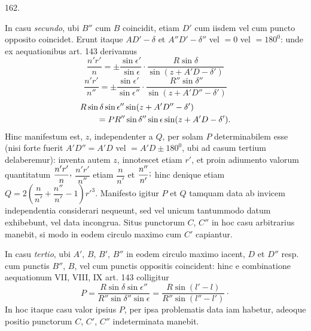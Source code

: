 \par{}\medskip
\begin{center}\hypertarget{native-225-article162}{}162.\end{center}
In casu \emph{secundo}, ubi $B''$ cum $B$ coincidit, etiam $D'$ cum iisdem vel
cum puncto opposito coincidet. Erunt itaque $AD'-\delta$ et $A''D'-\delta''$
vel $=0$ vel $=180^0$: unde ex aequationibus art. 143 derivamus
\[
\frac{n'r'}{n}=\pm\frac{\sin\epsilon'}{\sin\epsilon}\cdot
\frac{R\sin\delta}{\sin(z+A'D-\delta')}
\]
\[
\frac{n'r'}{n''}=\pm\frac{\sin\epsilon'}{\sin\epsilon''}\cdot
\frac{R''\sin\delta''}{\sin(z+A'D''-\delta')}
\]
\[
\begin{aligned}
&R\sin\delta\sin\epsilon''\sin(z+A'D''-\delta')\notag\\
&\qquad=PR''\sin\delta''\sin\epsilon\sin(z+A'D-\delta').
\end{aligned}
\]
Hinc manifestum est, $z$, independenter a $Q$, per solam $P$ determinabilem esse
(nisi forte fuerit $A'D''=A'D$ vel $=A'D\pm180^0$, ubi ad casum tertium
delaberemur): inventa autem $z$, innotescet etiam $r'$, et proin adiumento
valorum quantitatum $\dfrac{n'r'}{n}\mathpunct{\raisebox{.45ex}{,}}$
$\dfrac{n'r'}{n''}$ etiam $\dfrac{n}{n'}$ et
$\dfrac{n''}{n'}\mathpunct{\raisebox{.45ex}{;}}$ hinc denique etiam
$Q=2\left(\dfrac{n}{n'}+\dfrac{n''}{n'}-1\right)r'^3$.
Manifesto igitur $P$ et $Q$ tamquam data ab invicem independentia considerari
nequeunt, sed vel unicum tantummodo datum exhibebunt, vel data incongrua.
Situs punctorum $C$, $C''$ in hoc casu arbitrarius manebit, si modo in eodem
circulo maximo cum $C'$ capiantur.

In casu \emph{tertio}, ubi $A'$, $B$, $B'$, $B''$ in eodem circulo maximo
iacent, $D$ et $D''$ resp. cum punctis $B''$, $B$, vel cum punctis oppositis
coincident: hinc e combinatione aequationum VII, VIII, IX art. 143 colligitur
\[
P=\frac{R\sin\delta\sin\epsilon''}{R''\sin\delta''\sin\epsilon}
=\frac{R\sin(l'-l)}{R''\sin(l''-l')}\mathpunct{\cdot}
\]
In hoc itaque casu valor ipsius $P$, per ipsa problematis data iam habetur,
adeoque positio punctorum $C$, $C'$, $C''$ indeterminata manebit.
